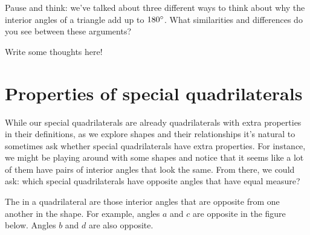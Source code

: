 \documentclass{ximera}
\begin{document}
\begin{question}
Pause and think: we've talked about three different ways to think about why the interior angles of a triangle add up to $180\degree$. What similarities and differences do you see between these arguments? 
\begin{freeResponse}
Write some thoughts here!
\end{freeResponse}
\end{question}


\section{Properties of special quadrilaterals}

While our special quadrilaterals are already quadrilaterals with extra properties in their definitions, as we explore shapes and their relationships it's natural to sometimes ask whether special quadrilaterals have extra properties. For instance, we might be playing around with some shapes and notice that it seems like a lot of them have pairs of interior angles that look the same. From there, we could ask: which special quadrilaterals have opposite angles that have equal measure?
\begin{definition}
The  in a quadrilateral are those interior angles that are opposite from one another in the shape. For example, angles $a$ and $c$ are opposite in the figure below. Angles $b$ and $d$ are also opposite.
\begin{center}
\end{center}
\end{definition}
\end{document}
